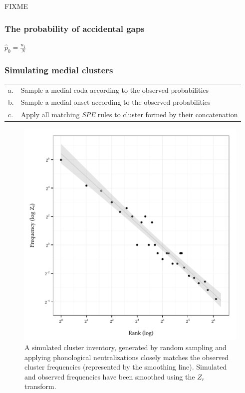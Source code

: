 FIXME

\subsubsection{The probability of accidental gaps}

\begin{unlabeledexample}
$\displaystyle \hat{p}_0 = \frac{n_1}{N}$
\end{unlabeledexample}


\subsubsection{Simulating medial clusters}
\label{simulate}

\begin{example}
\begin{tabular}{l l}
a. & Sample a medial coda according to the observed probabilities  \\
b. & Sample a medial onset according to the observed probabilities \\
c. & Apply all matching \emph{SPE} rules to cluster formed by their concatenation \\
\end{tabular}
\end{example}

\begin{figure}
\centering
\includegraphics{sim.pdf}
\caption{A simulated cluster inventory, generated by random sampling and applying phonological neutralizations closely matches the observed cluster frequencies (represented by the smoothing line). Simulated and observed frequencies have been smoothed using the $Z_r$ transform.}
\label{sim}
\end{figure}

